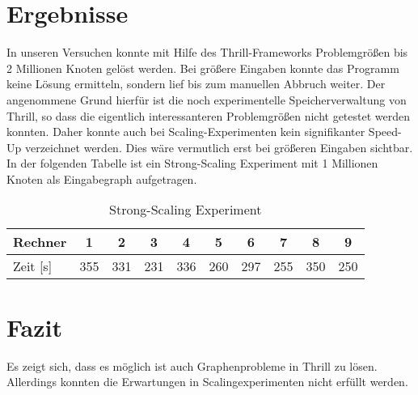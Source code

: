\documentclass[a0,portrait]{a0poster}
\begin{document}
\begin{multicols}{2}
\section*{Ergebnisse}

In unseren Versuchen konnte mit Hilfe des Thrill-Frameworks Problemgrößen bis 2 Millionen Knoten 
gelöst werden. Bei größere Eingaben konnte das Programm keine Lösung ermitteln, sondern lief bis 
zum manuellen Abbruch weiter. Der angenommene Grund hierfür ist die noch experimentelle 
Speicherverwaltung von Thrill, so dass die eigentlich interessanteren Problemgrößen nicht getestet 
werden konnten. Daher konnte auch bei Scaling-Experimenten kein signifikanter Speed-Up verzeichnet 
werden. Dies wäre vermutlich erst bei größeren Eingaben sichtbar.\\
In der folgenden Tabelle ist ein Strong-Scaling Experiment mit 1 Millionen Knoten als Eingabegraph
aufgetragen.

\begin{table}[H]          %
\centering
\begin{tabular*}{\linewidth}{@{\extracolsep{\fill}}lccccccccc}
\hline
\hline
\rule[-7pt]{0pt}{23pt}  Rechner & 1 & 2 & 3 & 4 & 5 & 6 & 7 & 8 & 9\\
\hline
\rule[-6pt]{0pt}{21pt}   Zeit [s] & 355 & 331 & 231 & 336 & 260 & 297 & 255 & 350 & 250\\
\hline
\hline
\hline
\end{tabular*}  
\caption[]{Strong-Scaling Experiment} 
\end{table}


\section*{Fazit}
Es zeigt sich, dass es möglich ist auch Graphenprobleme in Thrill zu lösen. Allerdings konnten die 
Erwartungen in Scalingexperimenten nicht erfüllt werden.                
        
\end{multicols}
\end{document}
